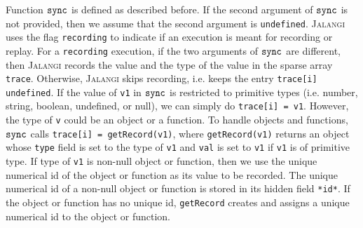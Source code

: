\documentclass{sig-alternate}
\def\jalangi{\textsc{Jalangi}}
\newcommand \dsl [1] {\ensuremath{{\tt #1}}\xspace}
\newcommand \Sync{\dsl{sync}}
\begin{document}
Function $\Sync$ is defined as described before.  If the second
argument of $\Sync$ is not provided, then we assume that the second
argument is \texttt{undefined}.  \jalangi{} uses the flag
\texttt{recording} to indicate if an execution is meant for recording
or replay.  For a \texttt{recording} execution, if the two arguments
of $\Sync$ are different, then \jalangi{} records the value and the
type of the value in the sparse array \texttt{trace}.  Otherwise,
\jalangi{} skips recording, i.e. keeps the entry \texttt{trace[i]}
\texttt{undefined}.  If the value of \texttt{v1} in $\Sync$ is
restricted to primitive types (i.e. number, string, boolean,
undefined, or null), we can simply do \texttt{trace[i] = v1}.
However, the type of \texttt{v} could be an object or a function.  To
handle objects and functions, $\Sync$ calls \texttt{trace[i] =
  getRecord(v1)}, where \texttt{getRecord(v1)} returns an object whose
\texttt{type} field is set to the type of \texttt{v1} and \texttt{val}
is set to \texttt{v1} if \texttt{v1} is of primitive type.  If type of
\texttt{v1} is non-null object or function, then we use the unique
numerical id of the object or function as its value to be recorded.
The unique numerical id of a non-null object or function is stored in
its hidden field \texttt{*id*}.  If the object or function has no
unique id, \texttt{getRecord} creates and assigns a unique numerical
id to the object or function.
\end{document}

